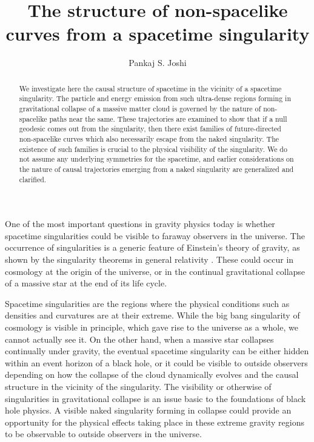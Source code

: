 \documentclass[twocolumn,aps,amsmath,amssymb,prl,showpacs,preprintnumbers]
{revtex4}
\begin{document}
\title{The structure of non-spacelike curves from a spacetime singularity}

\author{Pankaj S. Joshi}


\begin{abstract} We investigate here the causal structure of spacetime 
in the vicinity of a spacetime singularity. The particle and 
energy emission from such ultra-dense regions forming in gravitational 
collapse of a massive matter cloud is governed by the nature of 
non-spacelike paths near the same. These trajectories are examined 
to show that if a null geodesic comes out from the singularity, then 
there exist families of future-directed non-spacelike curves which 
also necessarily escape from the naked singularity. The existence of such 
families is crucial to the physical visibility of the singularity. 
We do not assume any underlying symmetries for the spacetime, and 
earlier considerations on the nature of causal trajectories emerging 
from a naked singularity are generalized and clarified. 
   

\end{abstract}

\maketitle

One of the most important questions in gravity physics today
is whether spacetime singularities could be visible to faraway
observers in the universe. The occurrence of singularities is a generic 
feature of Einstein's theory of gravity, as shown by the singularity 
theorems in general relativity
\cite{HE}. 
These could occur in cosmology at the origin of the universe, 
or in the continual gravitational collapse of a massive star at the 
end of its life cycle. 


Spacetime singularities are the regions where the physical 
conditions such as densities and curvatures are at their extreme. 
While the big bang singularity of cosmology is visible in principle, 
which gave rise to the universe as a whole, we cannot actually see it. 
On the other hand, when a massive star collapses continually 
under gravity, the eventual spacetime singularity can be either 
hidden within an event horizon of a black hole, or it could be 
visible to outside observers depending on how the collapse of the 
cloud dynamically evolves and the causal structure in the vicinity
of the singularity. The visibility or otherwise of singularities 
in gravitational collapse is an issue basic to the foundations of 
black hole physics. A visible naked singularity forming in collapse 
could provide an opportunity for the physical effects taking place 
in these extreme gravity regions to be observable to outside 
observers in the universe. 
\end{document}
